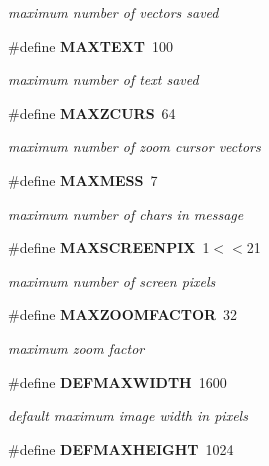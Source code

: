 \begin{CompactItemize}
\begin{CompactList}\small\item\em maximum number of vectors saved \item\end{CompactList}\item 
\#define {\bf MAXTEXT}\ 100\label{xtv_8h_a13}

\begin{CompactList}\small\item\em maximum number of text saved \item\end{CompactList}\item 
\#define {\bf MAXZCURS}\ 64\label{xtv_8h_a14}

\begin{CompactList}\small\item\em maximum number of zoom cursor vectors \item\end{CompactList}\item 
\#define {\bf MAXMESS}\ 7\label{xtv_8h_a15}

\begin{CompactList}\small\item\em maximum number of chars in message \item\end{CompactList}\item 
\#define {\bf MAXSCREENPIX}\ 1$<$$<$21\label{xtv_8h_a16}

\begin{CompactList}\small\item\em maximum number of screen pixels \item\end{CompactList}\item 
\#define {\bf MAXZOOMFACTOR}\ 32\label{xtv_8h_a17}

\begin{CompactList}\small\item\em maximum zoom factor \item\end{CompactList}\item 
\#define {\bf DEFMAXWIDTH}\ 1600\label{xtv_8h_a18}

\begin{CompactList}\small\item\em default maximum image width in pixels \item\end{CompactList}\item 
\#define {\bf DEFMAXHEIGHT}\ 1024\label{xtv_8h_a19}


\end{CompactItemize}

